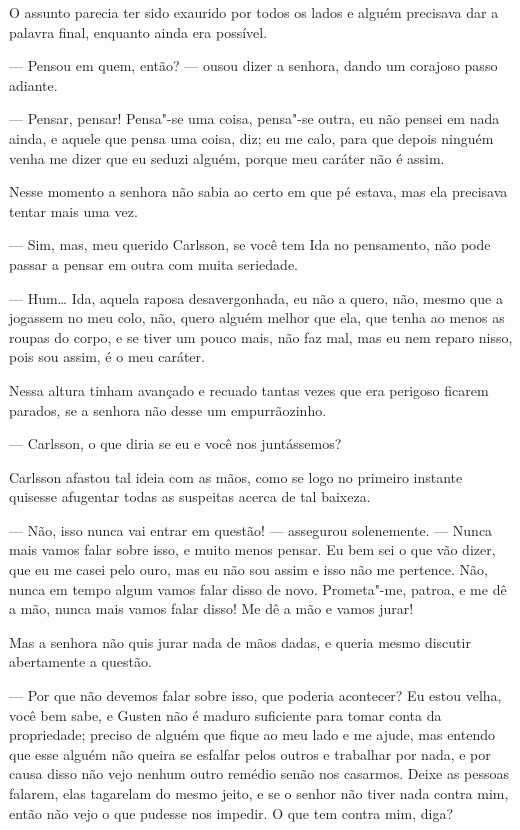 O assunto parecia ter sido exaurido por todos os lados e alguém precisava dar a
palavra final, enquanto ainda era possível.

--- Pensou em quem, então? --- ousou dizer a senhora, dando um corajoso passo adiante.

--- Pensar, pensar! Pensa"-se uma coisa, pensa"-se outra, eu não pensei em nada
ainda, e aquele que pensa uma coisa, diz; eu me calo, para que depois ninguém 
venha me dizer que eu seduzi alguém, porque meu caráter não é assim.

Nesse momento a senhora não sabia ao certo em que pé estava, mas ela precisava
tentar mais uma vez.

--- Sim, mas, meu querido Carlsson, se você tem Ida no pensamento, não pode passar a
pensar em outra com muita seriedade.

--- Hum\ldots{} Ida, aquela raposa desavergonhada, eu não a quero, não, mesmo que a jogassem no
meu colo, não, quero alguém melhor que ela, que tenha ao menos as roupas do corpo, e
se tiver um pouco mais, não faz mal, mas eu nem reparo nisso, pois sou assim, é
o meu caráter.

Nessa altura tinham avançado e recuado tantas vezes que era perigoso ficarem
parados, se a senhora não desse um empurrãozinho.

--- Carlsson, o que diria se eu e você nos juntássemos?

Carlsson afastou tal ideia com as mãos, como se logo no primeiro instante
quisesse afugentar todas as suspeitas acerca de tal baixeza.

--- Não, isso nunca vai entrar em questão! --- assegurou solenemente. --- Nunca
mais vamos falar sobre isso, e muito menos pensar. Eu bem sei o que vão dizer, 
que eu me casei pelo ouro, mas eu não sou assim e isso não me pertence. Não,
nunca em tempo algum vamos falar disso de novo. Prometa"-me, patroa, e me dê a mão,
nunca mais vamos falar disso! Me dê a mão e vamos jurar!

Mas a senhora não quis jurar nada de mãos dadas, e queria mesmo discutir
abertamente a questão.

--- Por que não devemos falar sobre isso, que poderia acontecer? Eu
estou velha, você bem sabe, e Gusten não é maduro suficiente para tomar conta da
propriedade; preciso de alguém que fique ao meu lado e me ajude, mas entendo
que esse alguém não queira se esfalfar pelos outros e trabalhar por nada, e por
causa disso não vejo nenhum outro remédio senão nos casarmos. Deixe as pessoas
falarem, elas tagarelam do mesmo jeito, e se o senhor não tiver nada contra mim,
então não vejo o que pudesse nos impedir. O que tem contra mim, diga?

